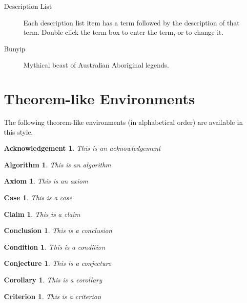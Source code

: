 \documentclass{article}
\newtheorem{acknowledgement}[theorem]{Acknowledgement}
\newtheorem{algorithm}[theorem]{Algorithm}
\newtheorem{axiom}[theorem]{Axiom}
\newtheorem{case}[theorem]{Case}
\newtheorem{claim}[theorem]{Claim}
\newtheorem{conclusion}[theorem]{Conclusion}
\newtheorem{condition}[theorem]{Condition}
\newtheorem{conjecture}[theorem]{Conjecture}
\newtheorem{corollary}[theorem]{Corollary}
\newtheorem{criterion}[theorem]{Criterion}
\begin{document}
\begin{description}
\item[Description List] Each description list item has a term followed by
the description of that term. Double click the term box to enter the term,
or to change it.

\item[Bunyip] Mythical beast of Australian Aboriginal legends.
\end{description}

\section{Theorem-like Environments}

The following theorem-like environments (in alphabetical order) are
available in this style.

\begin{acknowledgement}
This is an acknowledgement
\end{acknowledgement}

\begin{algorithm}
This is an algorithm
\end{algorithm}

\begin{axiom}
This is an axiom
\end{axiom}

\begin{case}
This is a case
\end{case}

\begin{claim}
This is a claim
\end{claim}

\begin{conclusion}
This is a conclusion
\end{conclusion}

\begin{condition}
This is a condition
\end{condition}

\begin{conjecture}
This is a conjecture
\end{conjecture}

\begin{corollary}
This is a corollary
\end{corollary}

\begin{criterion}
This is a criterion
\end{criterion}
\end{document}
